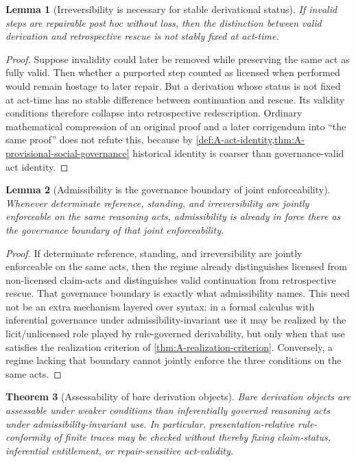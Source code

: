 \documentclass[11pt]{article}
\theoremstyle{plain}
\newtheorem{theorem}{Theorem}[section]
\newtheorem{lemma}[theorem]{Lemma}
\theoremstyle{definition}
\begin{document}
\begin{lemma}[Irreversibility is necessary for stable derivational status]
\label{lem:A-irreversibility}
If invalid steps are repairable post hoc without loss, then the distinction between valid derivation and retrospective rescue is not stably fixed at act-time.
\end{lemma}

\begin{proof}
Suppose invalidity could later be removed while preserving the same act as fully valid. Then whether a purported step counted as licensed when performed would remain hostage to later repair. But a derivation whose status is not fixed at act-time has no stable difference between continuation and rescue. Its validity conditions therefore collapse into retrospective redescription. Ordinary mathematical compression of an original proof and a later corrigendum into ``the same proof'' does not refute this, because by \cref{def:A-act-identity,thm:A-provisional-social-governance} historical identity is coarser than governance-valid act identity.
\end{proof}

\begin{lemma}[Admissibility is the governance boundary of joint enforceability]
\label{lem:A-adm-boundary}
Whenever determinate reference, standing, and irreversibility are jointly enforceable on the same reasoning acts, admissibility is already in force there as the governance boundary of that joint enforceability.
\end{lemma}

\begin{proof}
If determinate reference, standing, and irreversibility are jointly enforceable on the same acts, then the regime already distinguishes licensed from non-licensed claim-acts and distinguishes valid continuation from retrospective rescue. That governance boundary is exactly what admissibility names. This need not be an extra mechanism layered over syntax: in a formal calculus with inferential governance under admissibility-invariant use it may be realized by the licit/unlicensed role played by rule-governed derivability, but only when that use satisfies the realization criterion of \cref{thm:A-realization-criterion}. Conversely, a regime lacking that boundary cannot jointly enforce the three conditions on the same acts.
\end{proof}

\begin{theorem}[Assessability of bare derivation objects]
\label{thm:A-bare-trace-assessability}
Bare derivation objects are assessable under weaker conditions than inferentially governed reasoning
acts under admissibility-invariant use. In particular, presentation-relative rule-conformity of finite traces may be checked without
thereby fixing claim-status, inferential entitlement, or repair-sensitive act-validity.
\end{theorem}
\end{document}
